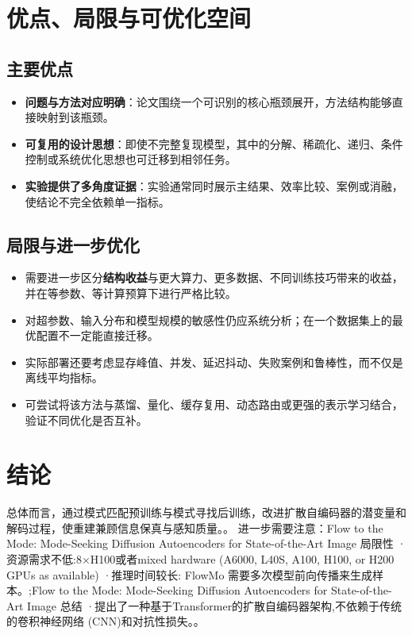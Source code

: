 \documentclass[UTF8,11pt,a4paper]{ctexart}
\newcommand{\term}[1]{\textbf{\textcolor{mainblue}{#1}}}
\begin{document}
\section{优点、局限与可优化空间}
\subsection{主要优点}
\begin{itemize}
\item \term{问题与方法对应明确}：论文围绕一个可识别的核心瓶颈展开，方法结构能够直接映射到该瓶颈。
\item \term{可复用的设计思想}：即使不完整复现模型，其中的分解、稀疏化、递归、条件控制或系统优化思想也可迁移到相邻任务。
\item \term{实验提供了多角度证据}：实验通常同时展示主结果、效率比较、案例或消融，使结论不完全依赖单一指标。
\end{itemize}

\subsection{局限与进一步优化}
\begin{itemize}
\item 需要进一步区分\term{结构收益}与更大算力、更多数据、不同训练技巧带来的收益，并在等参数、等计算预算下进行严格比较。
\item 对超参数、输入分布和模型规模的敏感性仍应系统分析；在一个数据集上的最优配置不一定能直接迁移。
\item 实际部署还要考虑显存峰值、并发、延迟抖动、失败案例和鲁棒性，而不仅是离线平均指标。
\item 可尝试将该方法与蒸馏、量化、缓存复用、动态路由或更强的表示学习结合，验证不同优化是否互补。
\end{itemize}

\section{结论}
总体而言，通过模式匹配预训练与模式寻找后训练，改进扩散自编码器的潜变量和解码过程，使重建兼顾信息保真与感知质量。。 进一步需要注意：Flow to the Mode: Mode-Seeking Diffusion Autoencoders for State-of-the-Art Image 局限性 ·资源需求不低:8×H100或者mixed hardware (A6000, L40S, A100, H100, or H200 GPUs as available) ·推理时间较长: FlowMo 需要多次模型前向传播来生成样本。;Flow to the Mode: Mode-Seeking Diffusion Autoencoders for State-of-the-Art Image 总结 ·提出了一种基于Transformer的扩散自编码器架构,不依赖于传统的卷积神经网络 (CNN)和对抗性损失。。
\end{document}
